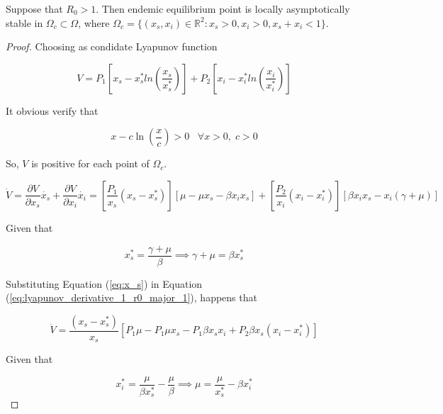\begin{theorem}
Suppose that $R_0 > 1$. Then endemic equilibrium point is locally asymptotically stable in $\Omega_c \subset \Omega$, where $\Omega_c = \{\left(x_s,x_i\right) \in \mathbb{R}^2 : x_s > 0, x_i > 0, x_s + x_i < 1\}$.
\end{theorem}

\begin{proof}
Choosing as condidate Lyapunov function

\begin{equation}
    \label{eq:lyapunov_r0_major_1}
    V = P_1 \left[ x_s - x_s^*ln\left( \frac{x_s}{x_s^*} \right)\right] + P_2 \left[ x_i - x_i^*ln\left( \frac{x_i}{x_i^*} \right)\right]
\end{equation}

It obvious verify that

\begin{equation}
    x - c\ln\left(\frac{x}{c}\right) > 0 \;\;\; \forall x > 0, \; c > 0
\end{equation}

So, $V$ is positive for each point of $\Omega_c$.

\begin{equation}
    \label{eq:lyapunov_derivative_1_r0_major_1}
    \dot{V} = \frac{\partial V}{\partial x_s} \dot{x_s} + \frac{\partial V}{\partial x_i} \dot{x_i} = \left[ \frac{P_1}{x_s}(x_s - x_s^*) \right] \left[ \mu - \mu x_s - \beta x_i x_s \right] + \left[ \frac{P_2}{x_i}(x_i - x_i^*) \right] \left[ \beta x_i x_s - x_i (\gamma + \mu) \right]
\end{equation}

Given that

\begin{equation}
    \label{eq:x_s}
    x_s^* = \frac{\gamma + \mu}{\beta} \implies \gamma + \mu = \beta x_s^*
\end{equation}

Substituting Equation (\ref{eq:x_s}) in Equation (\ref{eq:lyapunov_derivative_1_r0_major_1}), happens that

\begin{equation}
    \label{eq:lyapunov_derivative_2_r0_major_1}
    \dot{V} =  \frac{\left(x_s - x_s^*\right)}{x_s} \left[  P_1 \mu - P_1 \mu x_s - P_1\beta x_sx_i+P_2 \beta x_s \left( x_i - x_i^* \right) \right]
\end{equation}

Given that

\begin{equation}
    \label{eq:x_i}
    x_i^* = \frac{\mu}{\beta x_s^*} - \frac{\mu}{\beta} \implies \mu = \frac{\mu}{x_s^*} - \beta x_i^*
\end{equation}


\end{proof}
